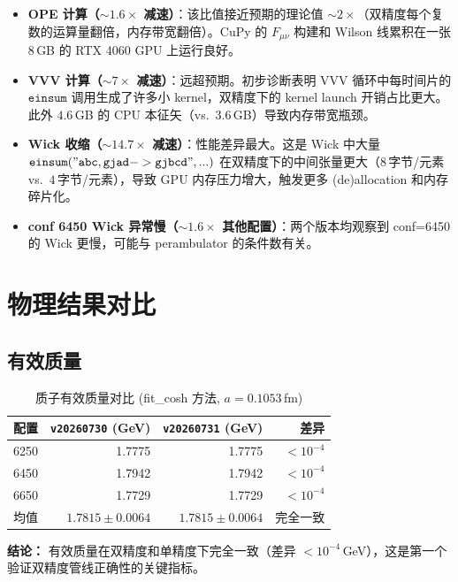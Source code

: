 \documentclass[12pt,a4paper]{ctexart}
\begin{document}
\begin{itemize}[itemsep=4pt]
  \item \textbf{OPE 计算（$\sim 1.6\times$ 减速）}：该比值接近预期的理论值 $\sim 2\times$（双精度每个复数的运算量翻倍，内存带宽翻倍）。CuPy 的 $F_{\mu\nu}$ 构建和 Wilson 线累积在一张 $8$\,GB 的 RTX 4060 GPU 上运行良好。
  \item \textbf{VVV 计算（$\sim 7\times$ 减速）}：远超预期。初步诊断表明 VVV 循环中每时间片的 $\mathtt{einsum}$ 调用生成了许多小 kernel，双精度下的 kernel launch 开销占比更大。此外 $4.6$\,GB 的 CPU 本征矢（vs.\ $3.6$\,GB）导致内存带宽瓶颈。
  \item \textbf{Wick 收缩（$\sim 14.7\times$ 减速）}：性能差异最大。这是 Wick 中大量 $\mathtt{einsum("abc,gjad->gjbcd", ...)}$ 在双精度下的中间张量更大（$8$\,字节/元素 vs.\ $4$\,字节/元素），导致 GPU 内存压力增大，触发更多 (de)allocation 和内存碎片化。
  \item \textbf{conf 6450 Wick 异常慢（$\sim 1.6\times$ 其他配置）}：两个版本均观察到 conf=6450 的 Wick 更慢，可能与 perambulator 的条件数有关。
\end{itemize}

\section{物理结果对比}

\subsection{有效质量}

\begin{table}[H]
\centering
\caption{质子有效质量对比 (fit\_cosh 方法, $a=0.1053$\,fm)}
\begin{tabular}{lrrr}
\toprule
配置 & \texttt{v20260730} (GeV) & \texttt{v20260731} (GeV) & 差异 \\
\midrule
6250 & 1.7775 & 1.7775 & $< 10^{-4}$ \\
6450 & 1.7942 & 1.7942 & $< 10^{-4}$ \\
6650 & 1.7729 & 1.7729 & $< 10^{-4}$ \\
\midrule
均值 & $1.7815 \pm 0.0064$ & $1.7815 \pm 0.0064$ & 完全一致 \\
\bottomrule
\end{tabular}
\end{table}

\textbf{结论：} 有效质量在双精度和单精度下完全一致（差异 $< 10^{-4}$\,GeV），这是第一个验证双精度管线正确性的关键指标。
\end{document}
